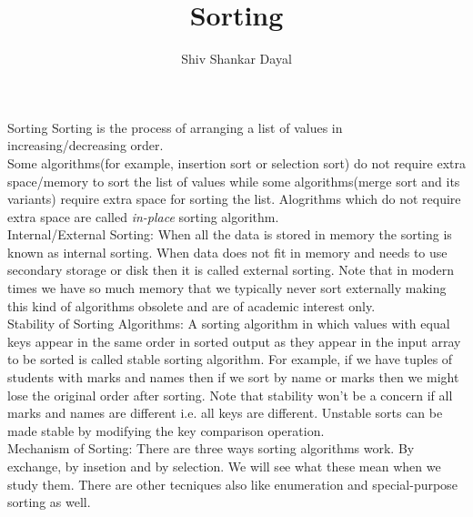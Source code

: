 \documentclass[aspectratio=169,8pt]{beamer}
\title{Sorting}
\author[Shiv Shankar Dayal]{Shiv Shankar Dayal}
\begin{document}
\begin{frame}
  \titlepage
\end{frame}
\begin{frame}{Sorting}
  Sorting is the process of arranging a list of values in increasing/decreasing order.\\
  \vspace*{0.2cm}
  Some algorithms(for example, insertion sort or selection sort) do not require extra space/memory to sort the list of values while
  some algorithms(merge sort and its variants) require extra space for sorting the list. Alogrithms which do not require extra
  space are called \textit{in-place} sorting algorithm.\\
  \vspace*{0.2cm}
  Internal/External Sorting: When all the data is stored in memory the sorting is known as internal sorting. When data does not fit
  in memory and needs to use secondary storage or disk then it is called external sorting. Note that in modern times we have so
  much memory that we typically never sort externally making this kind of algorithms obsolete and are of academic interest only.\\
  \vspace*{0.2cm}
  Stability of Sorting Algorithms: A sorting algorithm in which values with equal keys appear in the same order in sorted output as
  they appear in the input array to be sorted is called stable sorting algorithm. For example, if we have tuples of students with
  marks and names then if we sort by name or marks then we might lose the original order after sorting. Note that stability won't
  be a concern if all marks and names are different i.e. all keys are different. Unstable sorts can be made stable by modifying the
  key comparison operation.\\
  \vspace*{0.2cm}
  Mechanism of Sorting: There are three ways sorting algorithms work. By exchange, by insetion and by selection. We will see what
  these mean when we study them. There are other tecniques also like enumeration and special-purpose sorting as well.
\end{frame}
\end{document}
